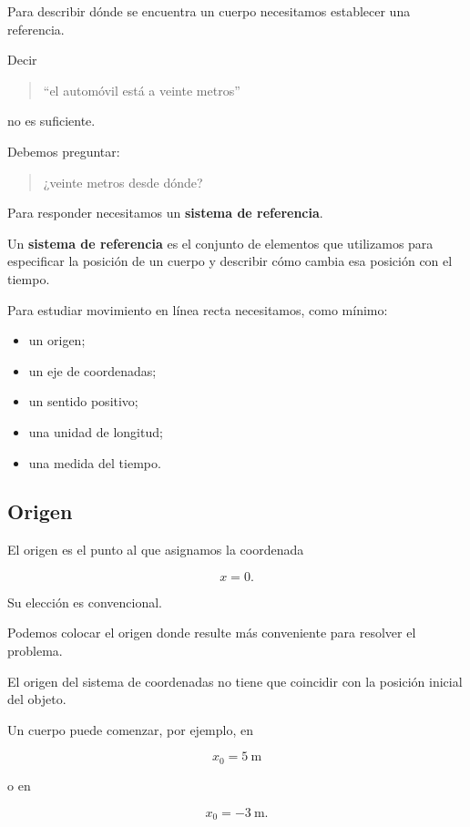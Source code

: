 Para describir dónde se encuentra un cuerpo necesitamos establecer una
referencia.

Decir

\begin{quote}
``el automóvil está a veinte metros''
\end{quote}

no es suficiente.

Debemos preguntar:

\begin{quote}
¿veinte metros desde dónde?
\end{quote}

Para responder necesitamos un \textbf{sistema de referencia}.

\begin{definicion}
Un \textbf{sistema de referencia} es el conjunto de elementos que utilizamos
para especificar la posición de un cuerpo y describir cómo cambia esa
posición con el tiempo.
\end{definicion}

Para estudiar movimiento en línea recta necesitamos, como mínimo:

\begin{itemize}
    \item un origen;
    \item un eje de coordenadas;
    \item un sentido positivo;
    \item una unidad de longitud;
    \item una medida del tiempo.
\end{itemize}


\subsection{Origen}

El origen es el punto al que asignamos la coordenada

\[ x=0. \]

Su elección es convencional.

Podemos colocar el origen donde resulte más conveniente para resolver el
problema.

\begin{advertencia}
El origen del sistema de coordenadas no tiene que coincidir con la posición
inicial del objeto.

Un cuerpo puede comenzar, por ejemplo, en

\[ x_0=\SI{5}{\meter} \]

o en

\[ x_0=-\SI{3}{\meter}. \]
\end{advertencia}


